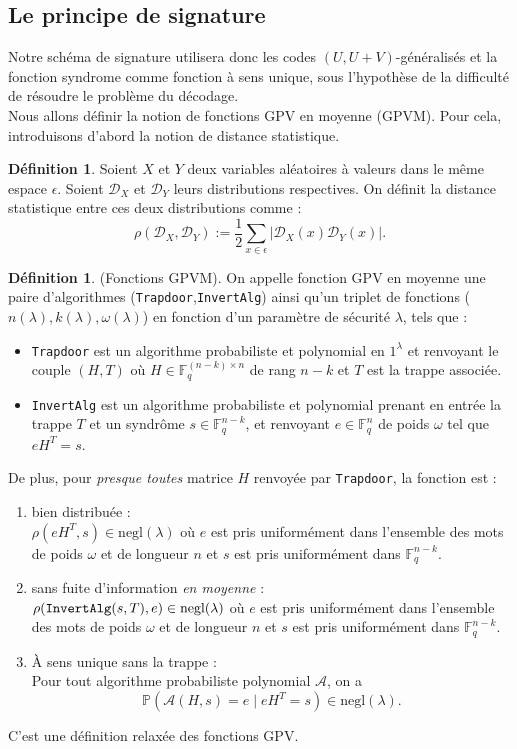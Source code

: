 \documentclass[12pt]{article}
\theoremstyle{plain}
\theoremstyle{definition}
\newtheorem{defi}[thm]{Définition}
\newcommand{\F}{\mathbb{F}}
\begin{document}
\subsection{Le principe de signature}

Notre schéma de signature utilisera donc les codes $(U,U+V)$-généralisés et la fonction syndrome comme fonction à sens unique, sous l'hypothèse de la difficulté de résoudre le problème du décodage. \\

\noindent Nous allons définir la notion de fonctions GPV en moyenne (GPVM). Pour cela, introduisons d'abord la notion de distance statistique.

\begin{defi}
Soient $X$ et $Y$ deux variables aléatoires à valeurs dans le même espace $\epsilon$. 
Soient $\mathcal{D}_X$ et $\mathcal{D}_Y$ leurs distributions respectives. On définit la distance statistique entre ces deux distributions comme :
$$ \rho(\mathcal{D}_X,\mathcal{D}_Y) := \frac{1}{2} \sum_{x \in \epsilon} |\mathcal{D}_X(x) \mathcal{D}_Y(x)|.$$
\end{defi}

\begin{defi} (Fonctions GPVM). On appelle fonction GPV en moyenne une paire d'algorithmes (\verb|Trapdoor|,\verb|InvertAlg|) ainsi qu'un triplet de fonctions ($n(\lambda),k(\lambda),\omega(\lambda)$) en fonction d'un paramètre de sécurité $\lambda$, tels que :
\begin{itemize}
\item \verb|Trapdoor| est un algorithme probabiliste et polynomial en $1^\lambda$ et renvoyant le couple $(H,T)$ où $H \in \F_q^{(n-k) \times n}$ de rang $n-k$ et $T$ est la trappe associée.
\item \verb|InvertAlg| est un algorithme probabiliste et polynomial prenant en entrée la trappe $T$ et un syndrôme $s \in \F_q^{n-k}$, et renvoyant $e \in \F_q^{n}$ de poids $\omega$ tel que $eH^T = s$.
\end{itemize}
De plus, pour \textit{presque toutes} matrice $H$ renvoyée par \verb|Trapdoor|, la fonction est :
\begin{enumerate}
\item bien distribuée : \\
$\rho(eH^T,s) \in \text{negl}(\lambda)$ où $e$ est pris uniformément dans l'ensemble des mots de poids $\omega$ et de longueur $n$ et $s$ est pris uniformément dans $\F_q^{n-k}$. 
\item sans fuite d'information \textit{en moyenne} : \\
$ \rho(\verb|InvertAlg|(s,T),e) \in \text{negl}(\lambda)$ où $e$ est pris uniformément dans l'ensemble des mots de poids $\omega$ et de longueur $n$ et $s$ est pris uniformément dans $\F_q^{n-k}$. 
\item \`A sens unique sans la trappe : \\
Pour tout algorithme probabiliste polynomial $\mathcal{A}$, on a 
$$\mathbb{P}(\mathcal{A}(H,s) = e \;| \;eH^T = s) \in \text{negl}(\lambda).$$
\end{enumerate}
C'est une définition relaxée des fonctions GPV.
\end{defi}
\end{document}
